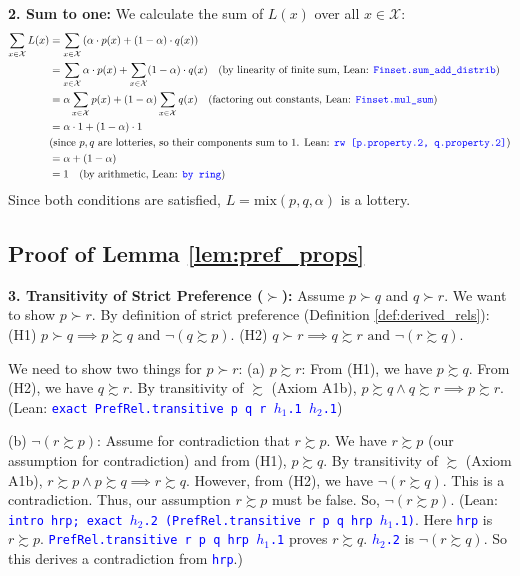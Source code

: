 \documentclass{article}
\theoremstyle{definition}
\newcommand{\X}{\mathcal{X}}
\newcommand{\tactic}[1]{\textcolor{blue}{\texttt{#1}}}
\newcommand{\pref}{\succsim} %
\newcommand{\strictpref}{\succ} %
\newcommand{\mix}{\mathrm{mix}} %
\begin{document}
\textbf{2. Sum to one:}
We calculate the sum of $L(x)$ over all $x \in \X$:
\begin{align*}
    \sum_{x \in \X} L(x) &= \sum_{x \in \X} \left( \alpha \cdot p(x) + (1-\alpha) \cdot q(x) \right) \\
    &= \sum_{x \in \X} \alpha \cdot p(x) + \sum_{x \in \X} (1-\alpha) \cdot q(x) \quad (\text{by linearity of finite sum, Lean: \tactic{Finset.sum\_add\_distrib}}) \\
    &= \alpha \sum_{x \in \X} p(x) + (1-\alpha) \sum_{x \in \X} q(x) \quad (\text{factoring out constants, Lean: \tactic{Finset.mul\_sum}}) \\
    &= \alpha \cdot 1 + (1-\alpha) \cdot 1 \\
    & (\text{since } p, q \text{ are lotteries, so their components sum to 1.
    Lean: \tactic{rw [p.property.2, q.property.2]}}) \\
    &= \alpha + (1-\alpha) \\
    &= 1 \quad (\text{by arithmetic, Lean: \tactic{by ring}})
\end{align*}
Since both conditions are satisfied, $L = \mix(p, q, \alpha)$ is a lottery.

\subsection{Proof of Lemma \ref{lem:pref_props}}\label{proof:lem:pref_props}
\textbf{3. Transitivity of Strict Preference ($\strictpref$):}
Assume $p \strictpref q$ and $q \strictpref r$. We want to show $p \strictpref r$.
By definition of strict preference (Definition \ref{def:derived_rels}):
(H1) $p \strictpref q \implies p \pref q \text{ and } \lnot(q \pref p)$.
(H2) $q \strictpref r \implies q \pref r \text{ and } \lnot(r \pref q)$.

We need to show two things for $p \strictpref r$:
(a) $p \pref r$:
From (H1), we have $p \pref q$. From (H2), we have $q \pref r$.
By transitivity of $\pref$ (Axiom A1b), $p \pref q \land q \pref r \implies p \pref r$.
(Lean: \tactic{exact PrefRel.transitive p q r $h_1$.1 $h_2$.1})

(b) $\lnot(r \pref p)$:
Assume for contradiction that $r \pref p$.
We have $r \pref p$ (our assumption for contradiction) and from (H1), $p \pref q$.
By transitivity of $\pref$ (Axiom A1b), $r \pref p \land p \pref q \implies r \pref q$.
However, from (H2), we have $\lnot(r \pref q)$. This is a contradiction.
Thus, our assumption $r \pref p$ must be false. So, $\lnot(r \pref p)$.
(Lean: \tactic{intro hrp; exact $h_2$.2 (PrefRel.transitive r p q hrp $h_1$.1)}. Here \tactic{hrp} is $r \pref p$. \tactic{PrefRel.transitive r p q hrp $h_1$.1} proves $r \pref q$. \tactic{$h_2$.2} is $\lnot(r \pref q)$. So this derives a contradiction from \tactic{hrp}.)
\end{document}
